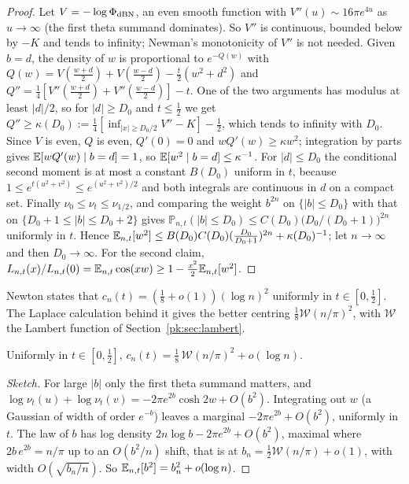 \begin{proof}
Let $V=-\log\Phi_{\rm dBN}$, an even smooth function with $V''(u)\sim16\pi e^{4u}$ as $u\to\infty$ (the first theta summand dominates). So $V''$ is continuous, bounded below by $-K$ and tends to infinity; Newman's monotonicity of $V''$ \cite{Newman91} is not needed. Given $b=d$, the density of $w$ is proportional to $e^{-Q(w)}$ with $Q(w)=V(\frac{w+d}2)+V(\frac{w-d}2)-\frac t2(w^2+d^2)$ and $Q''=\frac14[V''(\frac{w+d}2)+V''(\frac{w-d}2)]-t$. One of the two arguments has modulus at least $|d|/2$, so for $|d|\ge D_0$ and $t\le\frac12$ we get $Q''\ge\kappa(D_0):=\frac14[\inf_{|x|\ge D_0/2}V''-K]-\frac12$, which tends to infinity with $D_0$. Since $V$ is even, $Q$ is even, $Q'(0)=0$ and $wQ'(w)\ge\kappa w^2$; integration by parts gives $\mathbb{E}[wQ'(w)\mid b=d]=1$, so $\mathbb{E}[w^2\mid b=d]\le\kappa^{-1}$. For $|d|\le D_0$ the conditional second moment is at most a constant $B(D_0)$ uniform in $t$, because $1\le e^{t(u^2+v^2)}\le e^{(u^2+v^2)/2}$ and both integrals are continuous in $d$ on a compact set. Finally $\nu_0\le\nu_t\le\nu_{1/2}$, and comparing the weight $b^{2n}$ on $\{|b|\le D_0\}$ with that on $\{D_0+1\le|b|\le D_0+2\}$ gives $\mathbb P_{n,t}(|b|\le D_0)\le C(D_0)\bigl(D_0/(D_0+1)\bigr)^{2n}$ uniformly in $t$. Hence $\mathbb{E}_{n,t}[w^2]\le B(D_0)C(D_0)(\frac{D_0}{D_0+1})^{2n}+\kappa(D_0)^{-1}$; let $n\to\infty$ and then $D_0\to\infty$. For the second claim, $L_{n,t}(x)/L_{n,t}(0)=\mathbb{E}_{n,t}\cos(xw)\ge1-\frac{x^2}2\mathbb{E}_{n,t}[w^2]$.
\end{proof}

Newton states that $c_n(t)=(\frac18+o(1))(\log n)^2$ uniformly in $t\in[0,\frac12]$. The Laplace calculation behind it gives the better centring $\frac18\mathcal W(n/\pi)^2$, with $\mathcal W$ the Lambert function of Section~\ref{pk:sec:lambert}.

\begin{proposition}\label{nw:prop:lambert}
Uniformly in $t\in[0,\frac12]$, $c_n(t)=\frac18\,\mathcal W(n/\pi)^2+o(\log n)$.
\end{proposition}

\begin{proof}[Sketch]
For large $|b|$ only the first theta summand matters, and $\log\nu_t(u)+\log\nu_t(v)=-2\pi e^{2b}\cosh2w+O(b^2)$. Integrating out $w$ (a Gaussian of width of order $e^{-b}$) leaves a marginal $-2\pi e^{2b}+O(b^2)$, uniformly in $t$. The law of $b$ has log density $2n\log b-2\pi e^{2b}+O(b^2)$, maximal where $2b\,e^{2b}=n/\pi$ up to an $O(b^2/n)$ shift, that is at $b_n=\frac12\mathcal W(n/\pi)+o(1)$, with width $O(\sqrt{b_n/n})$. So $\mathbb{E}_{n,t}[b^2]=b_n^2+o(\log n)$.
\end{proof}

